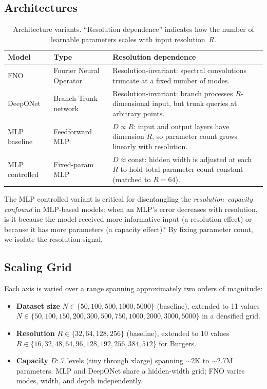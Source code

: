 \documentclass[11pt]{article}
\begin{document}
\subsection{Architectures}
\label{sec:architectures}

\begin{table}[h]
\centering
\caption{Architecture variants. ``Resolution dependence'' indicates
how the number of learnable parameters scales with input resolution~$R$.}
\label{tab:models}
\begin{tabular}{@{}llp{7cm}@{}}
\toprule
\textbf{Model} & \textbf{Type} & \textbf{Resolution dependence} \\
\midrule
FNO & Fourier Neural Operator & Resolution-invariant: spectral
convolutions truncate at a fixed number of modes. \\
DeepONet & Branch-Trunk network & Resolution-invariant: branch
processes $R$-dimensional input, but trunk queries at arbitrary
points. \\
MLP baseline & Feedforward MLP & $D \propto R$: input and output
layers have dimension $R$, so parameter count grows linearly with
resolution. \\
MLP controlled & Fixed-param MLP & $D \approx \mathrm{const}$:
hidden width is adjusted at each $R$ to hold total parameter count
constant (matched to $R = 64$). \\
\bottomrule
\end{tabular}
\end{table}

The MLP controlled variant is critical for disentangling the
\emph{resolution--capacity confound} in MLP-based models: when
an MLP's error decreases with resolution, is it because the model
received more informative input (a resolution effect) or because it
has more parameters (a capacity effect)?
By fixing parameter count, we isolate the resolution signal.

\subsection{Scaling Grid}
\label{sec:grid}

Each axis is varied over a range spanning approximately two orders of
magnitude:

\begin{itemize}[leftmargin=*,itemsep=2pt]
  \item \textbf{Dataset size} $N \in \{50, 100, 500, 1000, 5000\}$
    (baseline), extended to 11 values
    $N \in \{50, 100, 150, 200, 300, 500, 750, 1000, 2000, 3000, 5000\}$
    in a densified grid.
  \item \textbf{Resolution} $R \in \{32, 64, 128, 256\}$ (baseline),
    extended to 10 values
    $R \in \{16, 32, 48, 64, 96, 128, 192, 256, 384, 512\}$ for
    Burgers.
  \item \textbf{Capacity} $D$: 7 levels (tiny through xlarge) spanning
    $\sim$2K to $\sim$2.7M parameters. MLP and DeepONet share a
    hidden-width grid; FNO varies modes, width, and depth
    independently.
\end{itemize}
\end{document}
